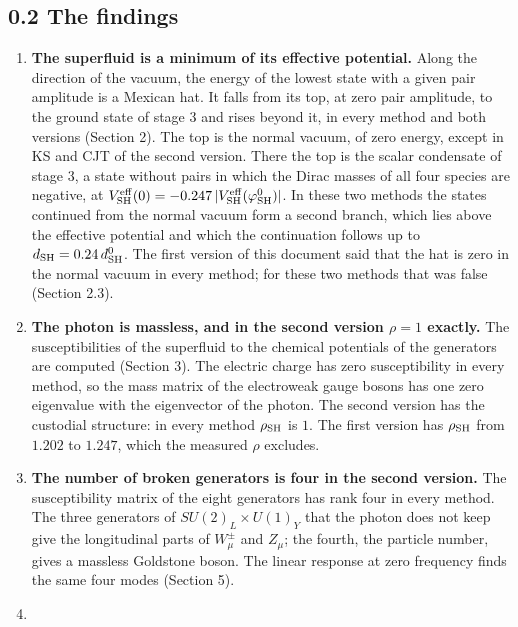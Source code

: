 \documentclass[
  10pt,
]{article}
\providecommand{\tightlist}{%
  \setlength{\itemsep}{0pt}\setlength{\parskip}{0pt}}
\begin{document}
\hypertarget{the-findings}{%
\subsection{0.2 The findings}\label{the-findings}}

\begin{enumerate}
\def\labelenumi{\arabic{enumi}.}
\tightlist
\item
  \textbf{The superfluid is a minimum of its effective potential.} Along
  the direction of the vacuum, the energy of the lowest state with a
  given pair amplitude is a Mexican hat. It falls from its top, at zero
  pair amplitude, to the ground state of stage 3 and rises beyond it, in
  every method and both versions (Section 2). The top is the normal
  vacuum, of zero energy, except in KS and CJT of the second version.
  There the top is the scalar condensate of stage 3, a state without
  pairs in which the Dirac masses of all four species are negative, at
  \(V^{\rm eff}_{\rm SH}(0)=-0.247\,\lvert V^{\rm eff}_{\rm SH}(\varphi^0_{\rm SH})\rvert\).
  In these two methods the states continued from the normal vacuum form
  a second branch, which lies above the effective potential and which
  the continuation follows up to \(d_{\rm SH}=0.24\,d^0_{\rm SH}\). The
  first version of this document said that the hat is zero in the normal
  vacuum in every method; for these two methods that was false (Section
  2.3).
\item
  \textbf{The photon is massless, and in the second version \(\rho=1\)
  exactly.} The susceptibilities of the superfluid to the chemical
  potentials of the generators are computed (Section 3). The electric
  charge has zero susceptibility in every method, so the mass matrix of
  the electroweak gauge bosons has one zero eigenvalue with the
  eigenvector of the photon. The second version has the custodial
  structure: in every method \(\rho_{\rm SH}\) is \(1\). The first
  version has \(\rho_{\rm SH}\) from \(1.202\) to \(1.247\), which the
  measured \(\rho\) excludes.
\item
  \textbf{The number of broken generators is four in the second
  version.} The susceptibility matrix of the eight generators has rank
  four in every method. The three generators of \(SU(2)_L\times U(1)_Y\)
  that the photon does not keep give the longitudinal parts of
  \(W^\pm_\mu\) and \(Z_\mu\); the fourth, the particle number, gives a
  massless Goldstone boson. The linear response at zero frequency finds
  the same four modes (Section 5).
\item

\end{enumerate}
\end{document}
